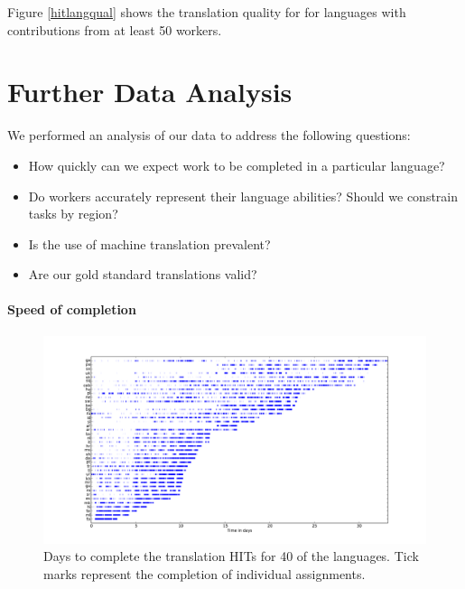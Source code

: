 \documentclass[11pt]{article}
\begin{document}
Figure \ref{hitlangqual} shows the translation quality for for languages with contributions from at least 50 workers.  



\section{Further Data Analysis}

We performed an analysis of our data to address the following questions:
\begin{itemize}
\item How quickly can we expect work to be completed in a particular language? 
\item Do workers accurately represent their language abilities?  Should we constrain tasks by region? 
\item Is the use of machine translation prevalent?  
\item Are our gold standard translations valid? 
\end{itemize}


\paragraph{Speed of completion}

\begin{figure}[h]
\includegraphics[height=\linewidth,angle=270]{final-figures/completetime}
\caption{Days to complete the translation HITs for 40 of the languages. Tick marks represent the completion of individual assignments. }
\label{completion-time}
\end{figure}
\end{document}
